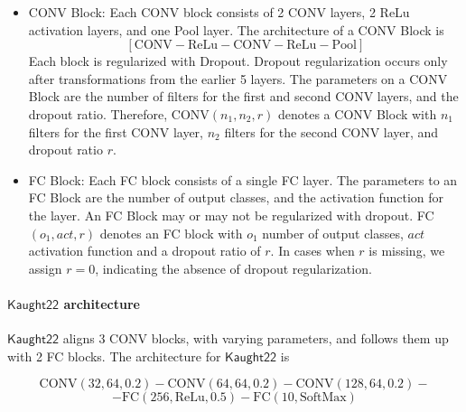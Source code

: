 \documentclass[]{article}
\newcommand*{\K}{\ensuremath{\mathsf{Kaught22}}}
\begin{document}
\begin{itemize}
\item CONV Block: Each CONV block consists of 2 CONV layers, 2 ReLu activation layers, and one Pool layer. The architecture of a CONV Block is 
\[
[\text{CONV} -\text{ReLu} - \text{CONV} - \text{ReLu} - \text{Pool}]
\]
Each block is regularized with Dropout. Dropout regularization occurs only after transformations from the earlier 5 layers. The parameters on a CONV Block are the number of filters for the first and second CONV layers, and the dropout ratio. Therefore, CONV$(n_1, n_2, r)$ denotes a CONV Block with $n_1$ filters for the first CONV layer, $n_2$ filters for the second CONV layer, and dropout ratio $r$.

\item FC Block: Each FC block consists of a single FC layer. The parameters to an FC Block are  the number of output classes, and the activation function for the layer. An FC Block may or may not be regularized with dropout. FC$(o_1, act, r)$ denotes an FC block with $o_1$ number of output classes, $act$ activation function and a dropout ratio of $r$. In cases when $r$ is missing, we assign $r = 0$, indicating the absence of dropout regularization. 
\end{itemize}

\paragraph{$\K$ architecture}
$\K$ aligns 3 CONV blocks, with varying parameters, and follows them up with 2 FC blocks. The architecture for $\K$ is

\[
\text{CONV}(32, 64, 0.2)-\text{CONV}(64, 64, 0.2) - \text{CONV}(128, 64, 0.2) -\]
\[ - \text{FC}(256, \text{ReLu}, 0.5) - \text{FC}(10, \text{SoftMax})
\]
 
\end{document}
